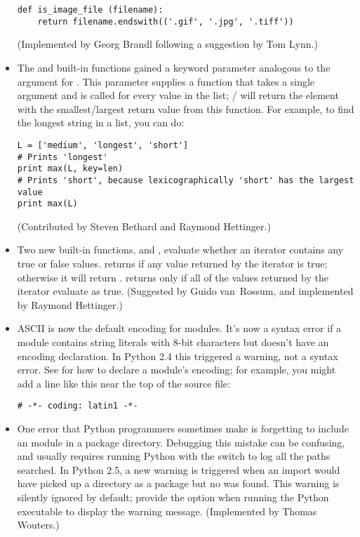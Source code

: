 \documentclass{howto}
\begin{document}
\begin{itemize}
\begin{verbatim}
def is_image_file (filename):
    return filename.endswith(('.gif', '.jpg', '.tiff'))
\end{verbatim}

(Implemented by Georg Brandl following a suggestion by Tom Lynn.)

\item The  and  built-in functions
gained a  keyword parameter analogous to the 
argument for .  This parameter supplies a function that
takes a single argument and is called for every value in the list;
/ will return the element with the 
smallest/largest return value from this function.
For example, to find the longest string in a list, you can do:

\begin{verbatim}
L = ['medium', 'longest', 'short']
# Prints 'longest'
print max(L, key=len)              
# Prints 'short', because lexicographically 'short' has the largest value
print max(L)         
\end{verbatim}

(Contributed by Steven Bethard and Raymond Hettinger.)

\item Two new built-in functions,  and
, evaluate whether an iterator contains any true or
false values.   returns  if any value
returned by the iterator is true; otherwise it will return
.   returns  only if
all of the values returned by the iterator evaluate as true.
(Suggested by Guido van~Rossum, and implemented by Raymond Hettinger.)

\item ASCII is now the default encoding for modules.  It's now 
a syntax error if a module contains string literals with 8-bit
characters but doesn't have an encoding declaration.  In Python 2.4
this triggered a warning, not a syntax error.  See  
for how to declare a module's encoding; for example, you might add 
a line like this near the top of the source file:

\begin{verbatim}
# -*- coding: latin1 -*-
\end{verbatim}

\item One error that Python programmers sometimes make is forgetting
to include an  module in a package directory.
Debugging this mistake can be confusing, and usually requires running
Python with the  switch to log all the paths searched.
In Python 2.5, a new  warning is triggered when
an import would have picked up a directory as a package but no
 was found.  This warning is silently ignored by default;
provide the  option when running the Python executable
to display the warning message.
(Implemented by Thomas Wouters.)


\end{itemize}
\end{document}
